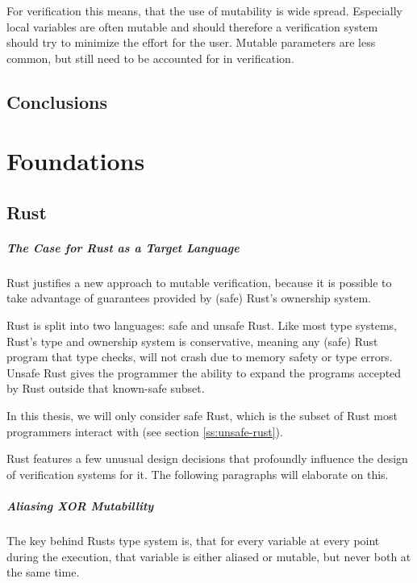 \documentclass{book}
\theoremstyle{definition}
\begin{document}
For verification this means, that the use of mutability is wide spread. Especially local variables are often mutable and should therefore a verification system should try to minimize the effort for the user. Mutable parameters are less common, but still need to be accounted for in verification.

\section{Conclusions}

\chapter{Foundations}

\section{Rust}

\paragraph{The Case for Rust as a Target Language}


Rust justifies a new approach to mutable verification, because it is possible to take advantage of guarantees provided by (safe) Rust's ownership system. 

Rust is split into two languages: safe and unsafe Rust. Like most type systems, Rust's type and ownership system is conservative, meaning any (safe) Rust program that type checks, will not crash due to memory safety or type errors. Unsafe Rust gives the programmer the ability to expand the programs accepted by Rust outside that known-safe subset.

In this thesis, we will only consider safe Rust, which is the subset of Rust most programmers interact with (see section \ref{ss:unsafe-rust}).

Rust features a few unusual design decisions that profoundly influence the design of verification systems for it. The following paragraphs will elaborate on this.

\paragraph{Aliasing XOR Mutabillity} The key behind Rusts type system is, that for every variable at every point during the execution, that variable is either aliased or mutable, but never both at the same time.
\end{document}
